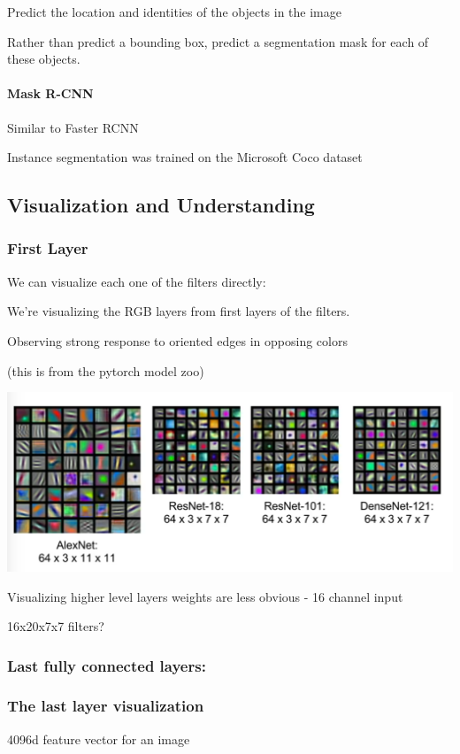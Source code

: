 Predict the location and identities of the objects in the image

Rather than predict a bounding box, predict a segmentation mask for each of these objects.

\paragraph{Mask R-CNN }

Similar to Faster RCNN

Instance segmentation was trained on the Microsoft Coco dataset

\subsection{Visualization and Understanding}

\subsubsection{First Layer}

We can visualize each one of the filters directly:

We're visualizing the RGB layers from first layers of the filters. 

Observing  strong response to oriented edges in opposing colors

(this is from the pytorch model zoo)

\includegraphics[width=0.5\columnwidth]{fei_fei_li/lecture_12/first_layer_vis.png}

Visualizing higher level layers weights are less obvious - 16 channel input

16x20x7x7 filters?

\subsubsection{Last fully connected layers:}

\subsubsection{The last layer visualization}

4096d feature vector for an image

